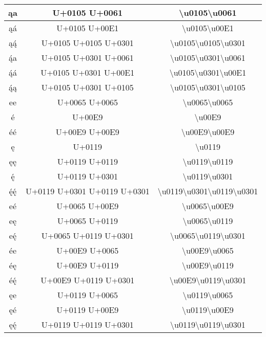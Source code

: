 \begin{longtable}{|c|c|c|}
ąa & U+0105 U+0061  & \textbackslash{}u0105\textbackslash{}u0061 \\ \hline
ąá & U+0105 U+00E1 & \textbackslash{}u0105\textbackslash{}u00E1 \\ \hline
ąą́ & U+0105 U+0105 U+0301  & \textbackslash{}u0105\textbackslash{}u0105\textbackslash{}u0301 \\ \hline

ą́a & U+0105 U+0301 U+0061 & \textbackslash{}u0105\textbackslash{}u0301\textbackslash{}u0061 \\ \hline
ą́á & U+0105 U+0301 U+00E1 & \textbackslash{}u0105\textbackslash{}u0301\textbackslash{}u00E1 \\ \hline
ą́ą & U+0105 U+0301 U+0105 & \textbackslash{}u0105\textbackslash{}u0301\textbackslash{}u0105 \\ \hline

ee & U+0065 U+0065 & \textbackslash{}u0065\textbackslash{}u0065 \\ \hline
é & U+00E9 & \textbackslash{}u00E9 \\ \hline
éé & U+00E9 U+00E9 & \textbackslash{}u00E9\textbackslash{}u00E9 \\ \hline
ę & U+0119 & \textbackslash{}u0119 \\ \hline
ęę & U+0119 U+0119 & \textbackslash{}u0119\textbackslash{}u0119 \\ \hline
ę́ & U+0119 U+0301 & \textbackslash{}u0119\textbackslash{}u0301 \\ \hline
ę́ę́ & U+0119 U+0301 U+0119 U+0301 & \textbackslash{}u0119\textbackslash{}u0301\textbackslash{}u0119\textbackslash{}u0301 \\ \hline

eé & U+0065 U+00E9 & \textbackslash{}u0065\textbackslash{}u00E9 \\ \hline
eę & U+0065 U+0119 & \textbackslash{}u0065\textbackslash{}u0119 \\ \hline
eę́ & U+0065 U+0119 U+0301 & \textbackslash{}u0065\textbackslash{}u0119\textbackslash{}u0301 \\ \hline

ée & U+00E9 U+0065 & \textbackslash{}u00E9\textbackslash{}u0065 \\ \hline
éę & U+00E9 U+0119 & \textbackslash{}u00E9\textbackslash{}u0119 \\ \hline
éę́ & U+00E9 U+0119 U+0301 & \textbackslash{}u00E9\textbackslash{}u0119\textbackslash{}u0301 \\ \hline

ęe & U+0119 U+0065 & \textbackslash{}u0119\textbackslash{}u0065 \\ \hline
ęé & U+0119 U+00E9  & \textbackslash{}u0119\textbackslash{}u00E9 \\ \hline
ęę́ & U+0119 U+0119 U+0301 & \textbackslash{}u0119\textbackslash{}u0119\textbackslash{}u0301 \\ \hline


\end{longtable}
